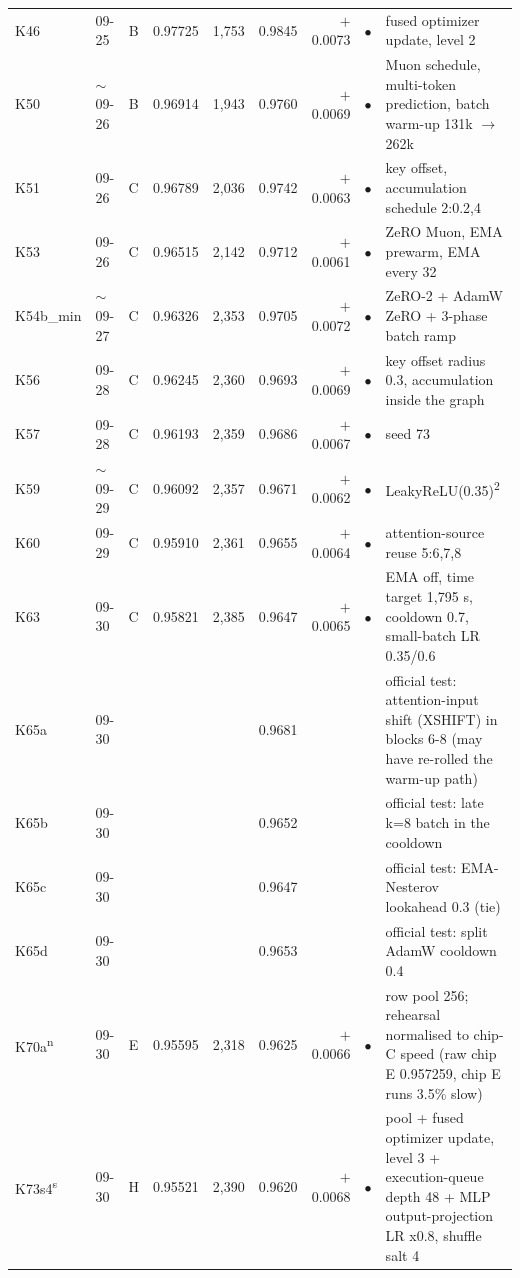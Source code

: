 {\begin{tabular}{@{}llcrrrrcp{7.9cm}@{}}
K46 & 09-25 & B & 0.97725 & 1{,}753 & 0.9845 & \ensuremath{+}0.0073 & $\bullet$ & fused optimizer update, level 2 \\
K50 & $\sim$09-26 & B & 0.96914 & 1{,}943 & 0.9760 & \ensuremath{+}0.0069 & $\bullet$ & Muon schedule, multi-token prediction, batch warm-up 131k $\rightarrow$ 262k \\
K51 & 09-26 & C & 0.96789 & 2{,}036 & 0.9742 & \ensuremath{+}0.0063 & $\bullet$ & key offset, accumulation schedule 2:0.2,4 \\
K53 & 09-26 & C & 0.96515 & 2{,}142 & 0.9712 & \ensuremath{+}0.0061 & $\bullet$ & ZeRO Muon, EMA prewarm, EMA every 32 \\
K54b\_min & $\sim$09-27 & C & 0.96326 & 2{,}353 & 0.9705 & \ensuremath{+}0.0072 & $\bullet$ & ZeRO-2 + AdamW ZeRO + 3-phase batch ramp \\
K56 & 09-28 & C & 0.96245 & 2{,}360 & 0.9693 & \ensuremath{+}0.0069 & $\bullet$ & key offset radius 0.3, accumulation inside the graph \\
K57 & 09-28 & C & 0.96193 & 2{,}359 & 0.9686 & \ensuremath{+}0.0067 & $\bullet$ & seed 73 \\
K59 & $\sim$09-29 & C & 0.96092 & 2{,}357 & 0.9671 & \ensuremath{+}0.0062 & $\bullet$ & LeakyReLU(0.35)\textsuperscript{2} \\
K60 & 09-29 & C & 0.95910 & 2{,}361 & 0.9655 & \ensuremath{+}0.0064 & $\bullet$ & attention-source reuse 5:6,7,8 \\
K63 & 09-30 & C & 0.95821 & 2{,}385 & 0.9647 & \ensuremath{+}0.0065 & $\bullet$ & EMA off, time target 1,795 s, cooldown 0.7, small-batch LR 0.35/0.6 \\
K65a & 09-30 &  &  &  & 0.9681 &  &  & official test: attention-input shift (XSHIFT) in blocks 6-8 (may have re-rolled the warm-up path) \\
K65b & 09-30 &  &  &  & 0.9652 &  &  & official test: late k=8 batch in the cooldown \\
K65c & 09-30 &  &  &  & 0.9647 &  &  & official test: EMA-Nesterov lookahead 0.3 (tie) \\
K65d & 09-30 &  &  &  & 0.9653 &  &  & official test: split AdamW cooldown 0.4 \\
K70a\textsuperscript{n} & 09-30 & E & 0.95595 & 2{,}318 & 0.9625 & \ensuremath{+}0.0066 & $\bullet$ & row pool 256; rehearsal normalised to chip-C speed (raw chip E 0.957259, chip E runs 3.5\% slow) \\
K73s4\textsuperscript{s} & 09-30 & H & 0.95521 & 2{,}390 & 0.9620 & \ensuremath{+}0.0068 & $\bullet$ & pool + fused optimizer update, level 3 + execution-queue depth 48 + MLP output-projection LR x0.8, shuffle salt 4 \\

\end{tabular}}
